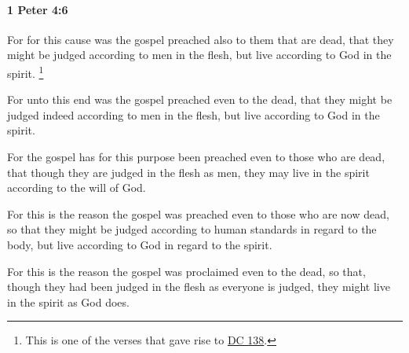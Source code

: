 		\paragraph{1 Peter 4:6} %
			\label{1PETER-4-6}

			For for this cause was the gospel preached also to them that are dead, that they might be judged according to men in the flesh, but live according to God in the spirit.%
				\footnote{%
					This is one of the verses that gave rise to \hyperref[DC138]{DC 138}.
					}

			\begin{framed}
			\scriptsize
				\begin{compactdesc}
					\item[SBLG] 
					\item[ASV] For unto this end was the gospel preached even to the dead, that they might be judged indeed according to men in the flesh, but live according to God in the spirit.
					\item[NASB] For the gospel has for this purpose been preached even to those who are dead, that though they are judged in the flesh as men, they may live in the spirit according to the will of God.
					\item[NIV] For this is the reason the gospel was preached even to those who are now dead, so that they might be judged according to human standards in regard to the body, but live according to God in regard to the spirit.
					\item[NRSV] For this is the reason the gospel was proclaimed even to the dead, so that, though they had been judged in the flesh as everyone is judged, they might live in the spirit as God does.
				\end{compactdesc}
			\end{framed}

